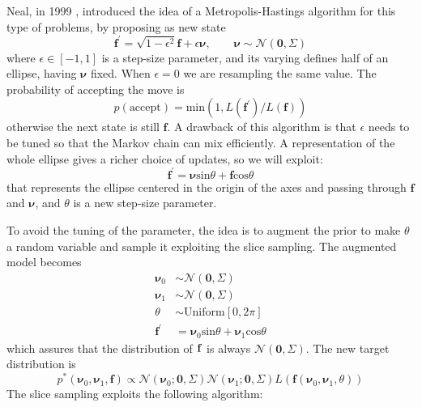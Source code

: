 \documentclass{article}
\begin{document}
Neal, in 1999 \cite{Neal}, introduced the idea of a Metropolis-Hastings algorithm for this type of problems, by proposing as new state 
$$\mathbf{f^{'}}=\sqrt{1-\epsilon^2}\mathbf{f}+\epsilon\pmb{\nu},\qquad\pmb{\nu}\sim\mathcal{N}(\mathbf{0}, \Sigma)$$ where $\epsilon\in[-1,1]$ is a step-size parameter, and its varying defines half of an ellipse, having $\pmb{\nu}$ fixed. When $\epsilon=0$ we are resampling the same value. The probability of accepting the move is $$p(\text{accept})=\text{min}(1,L(\mathbf{f^{'}})/L(\mathbf{f}))$$ otherwise the next state is still $\mathbf{f}$. A drawback of this algorithm is that $\epsilon$ needs to be tuned so that the Markov chain can mix efficiently. A representation of the whole ellipse gives a richer choice of updates, so we will exploit: $$\mathbf{f^{'}}=\pmb{\nu}\text{sin}\theta+\mathbf{f}\text{cos}\theta$$ that represents the ellipse centered in the origin of the axes and passing through $\mathbf{f}$ and $\pmb{\nu}$, and $\theta$ is a new step-size parameter.

To avoid the tuning of the parameter, the idea is to augment the prior to make $\theta$ a random variable and sample it exploiting the slice sampling. The augmented model becomes
\begin{align*}
\pmb{\nu}_0&\sim\mathcal{N}(\mathbf{0},\Sigma)\\
\pmb{\nu}_1&\sim\mathcal{N}(\mathbf{0},\Sigma)\\
\theta&\sim \text{Uniform}[0,2\pi]\\
\mathbf{f^{'}}&=\pmb{\nu}_0\text{sin}\theta+\pmb{\nu}_1\text{cos}\theta
\end{align*}
which assures that the distribution of $\bf{f}$ is always $\mathcal{N}(\mathbf{0},\Sigma)$. The new target distribution is $$p^*(\pmb{\nu}_0,\pmb{\nu}_1,\mathbf{f})\propto\mathcal{N}(\pmb{\nu}_0;\mathbf{0},\Sigma)\mathcal{N}(\pmb{\nu}_1;\mathbf{0},\Sigma)L(\mathbf{f}(\pmb{\nu}_0,\pmb{\nu}_1,\theta))$$
The slice sampling exploits the following algorithm:\\
\end{document}
